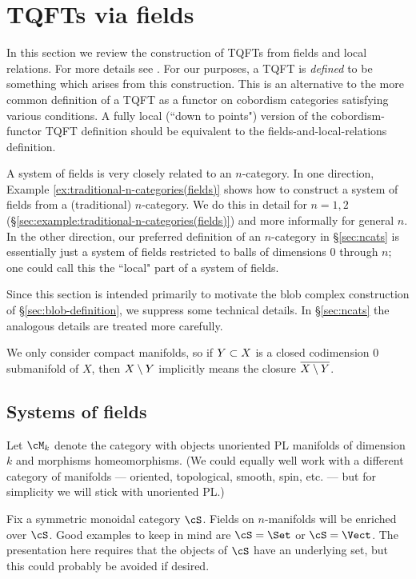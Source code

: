 
\section{TQFTs via fields}
\label{sec:fields}
\label{sec:tqftsviafields}

In this section we review the construction of TQFTs from fields and local relations.
For more details see \cite{kw:tqft}.
For our purposes, a TQFT is {\it defined} to be something which arises
from this construction.
This is an alternative to the more common definition of a TQFT
as a functor on cobordism categories satisfying various conditions.
A fully local (``down to points") version of the cobordism-functor TQFT definition
should be equivalent to the fields-and-local-relations definition.

A system of fields is very closely related to an $n$-category.
In one direction, Example \ref{ex:traditional-n-categories(fields)}
shows how to construct a system of fields from a (traditional) $n$-category.
We do this in detail for $n=1,2$ (\S\ref{sec:example:traditional-n-categories(fields)}) 
and more informally for general $n$.
In the other direction, 
our preferred definition of an $n$-category in \S\ref{sec:ncats} is essentially
just a system of fields restricted to balls of dimensions 0 through $n$;
one could call this the ``local" part of a system of fields.

Since this section is intended primarily to motivate
the blob complex construction of \S\ref{sec:blob-definition}, 
we suppress some technical details.
In \S\ref{sec:ncats} the analogous details are treated more carefully.

\medskip

We only consider compact manifolds, so if $Y \subset X$ is a closed codimension 0
submanifold of $X$, then $X \setminus Y$ implicitly means the closure
$\overline{X \setminus Y}$.


\subsection{Systems of fields}

Let $\cM_k$ denote the category with objects 
unoriented PL manifolds of dimension
$k$ and morphisms homeomorphisms.
(We could equally well work with a different category of manifolds ---
oriented, topological, smooth, spin, etc. --- but for simplicity we
will stick with unoriented PL.)

Fix a symmetric monoidal category $\cS$.
Fields on $n$-manifolds will be enriched over $\cS$.
Good examples to keep in mind are $\cS = \Set$ or $\cS = \Vect$.
The presentation here requires that the objects of $\cS$ have an underlying set, but this could probably be avoided if desired.

